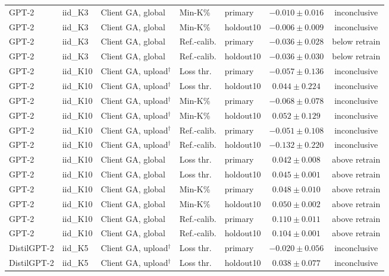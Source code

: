 \begin{table}[t]
\begin{tabular*}{\textwidth}{@{\extracolsep{\fill}}lllllcc@{}}
GPT-2 & iid\_K3 & Client GA, global & Min-K\% & primary & $-0.010 \pm 0.016$ & inconclusive \\
GPT-2 & iid\_K3 & Client GA, global & Min-K\% & holdout10 & $-0.006 \pm 0.009$ & inconclusive \\
GPT-2 & iid\_K3 & Client GA, global & Ref.-calib. & primary & $-0.036 \pm 0.028$ & below retrain \\
GPT-2 & iid\_K3 & Client GA, global & Ref.-calib. & holdout10 & $-0.036 \pm 0.030$ & below retrain \\
GPT-2 & iid\_K10 & Client GA, upload$^{\dagger}$ & Loss thr. & primary & $-0.057 \pm 0.136$ & inconclusive \\
GPT-2 & iid\_K10 & Client GA, upload$^{\dagger}$ & Loss thr. & holdout10 & $0.044 \pm 0.224$ & inconclusive \\
GPT-2 & iid\_K10 & Client GA, upload$^{\dagger}$ & Min-K\% & primary & $-0.068 \pm 0.078$ & inconclusive \\
GPT-2 & iid\_K10 & Client GA, upload$^{\dagger}$ & Min-K\% & holdout10 & $0.052 \pm 0.129$ & inconclusive \\
GPT-2 & iid\_K10 & Client GA, upload$^{\dagger}$ & Ref.-calib. & primary & $-0.051 \pm 0.108$ & inconclusive \\
GPT-2 & iid\_K10 & Client GA, upload$^{\dagger}$ & Ref.-calib. & holdout10 & $-0.132 \pm 0.220$ & inconclusive \\
GPT-2 & iid\_K10 & Client GA, global & Loss thr. & primary & $0.042 \pm 0.008$ & above retrain \\
GPT-2 & iid\_K10 & Client GA, global & Loss thr. & holdout10 & $0.045 \pm 0.001$ & above retrain \\
GPT-2 & iid\_K10 & Client GA, global & Min-K\% & primary & $0.048 \pm 0.010$ & above retrain \\
GPT-2 & iid\_K10 & Client GA, global & Min-K\% & holdout10 & $0.050 \pm 0.002$ & above retrain \\
GPT-2 & iid\_K10 & Client GA, global & Ref.-calib. & primary & $0.110 \pm 0.011$ & above retrain \\
GPT-2 & iid\_K10 & Client GA, global & Ref.-calib. & holdout10 & $0.104 \pm 0.001$ & above retrain \\
DistilGPT-2 & iid\_K5 & Client GA, upload$^{\dagger}$ & Loss thr. & primary & $-0.020 \pm 0.056$ & inconclusive \\
DistilGPT-2 & iid\_K5 & Client GA, upload$^{\dagger}$ & Loss thr. & holdout10 & $0.038 \pm 0.077$ & inconclusive \\

\end{tabular*}
\end{table}
